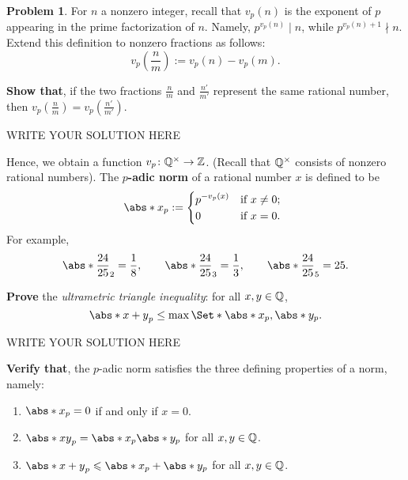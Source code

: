 \documentclass[11pt]{article}
\theoremstyle{plain}
\theoremstyle{definition}
\newtheorem{problem}{Problem}
\theoremstyle{remark}
\numberwithin{equation}{problem}
\begin{document}
\begin{problem}\label{Problem 15.3}
  For $n$ a nonzero integer, recall that $v_p(n)$ is the exponent of $p$ appearing in the prime factorization of $n$. Namely, $p^{v_p(n)}\mid n$, while $p^{v_p(n)+1}\nmid n$. Extend this definition to nonzero fractions as follows:
	\[
		v_p(\frac{n}{m}) := v_p(n) - v_p(m).
	\]
  \begin{listinprob}
		\item \textbf{Show that}, if the two fractions $\frac{n}{m}$ and $\frac{n'}{m'}$ represent the same rational number, then $v_p(\frac{n}{m})=v_p(\frac{n'}{m'})$.
\begin{solution} %
WRITE YOUR SOLUTION HERE
\end{solution}\clearpage %
  \end{listinprob}
	Hence, we obtain a function $v_p\colon\mathbb{Q}^{\times}\to\mathbb{Z}$. (Recall that $\mathbb{Q}^{\times}$ consists of nonzero rational numbers). The \textbf{$p$-adic norm} of a rational number $x$ is defined to be
	\[
		\abs*{x}_p:=
		\begin{dcases*}
			p^{-v_p(x)} & if $x\neq 0$;\\
			0 & if $x=0$.
		\end{dcases*}
	\]
	For example,
	\[
		\abs*{\frac{24}{25}}_{2} = \frac{1}{8},\qquad 
		\abs*{\frac{24}{25}}_{3} = \frac{1}{3},\qquad 
		\abs*{\frac{24}{25}}_{5} = 25.
	\]  
  \begin{listinprob}[resume]
		\item \textbf{Prove} the \emph{ultrametric triangle inequality}: for all $x,y\in\mathbb{Q}$,
		\[
			\abs*{x+y}_p \leq \max\Set*{\abs*{x}_p,\abs*{y}_p}.
		\]
\begin{solution} %
WRITE YOUR SOLUTION HERE
\end{solution}\clearpage %
		\item \textbf{Verify that}, the $p$-adic norm satisfies the three defining properties of a norm, namely:
		\begin{enumerate}%
			\item $\abs*{x}_{p}=0$ if and only if $x=0$.
			\item $\abs*{xy}_{p}=\abs*{x}_{p}\abs*{y}_{p}$ for all $x,y\in\mathbb{Q}$.
			\item $\abs*{x+y}_{p}\le\abs*{x}_{p}+\abs*{y}_{p}$ for all $x,y\in\mathbb{Q}$.
		\end{enumerate}

\end{listinprob}
\end{problem}
\end{document}
